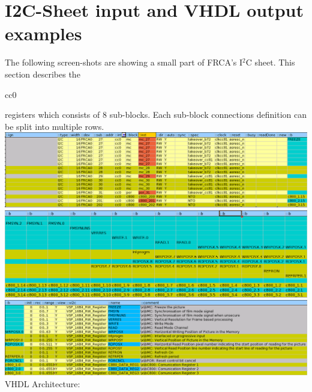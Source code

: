 \documentclass[a4paper,12pt]{report}
\begin{document}
\section{I2C-Sheet input and VHDL output examples}
The following screen-shots are showing a small part of  FRCA's I$^2$C sheet. This section describes the \begin{tt}cc0\end{tt} registers which consists of 8 sub-blocks. Each sub-block connections definition can be split into multiple rows.\newline
\newline
\includegraphics[scale=0.43]{images/FRCA_iic_part0.png}\newline
\newline
\includegraphics[scale=0.45]{images/FRCA_iic_part1.png}\newline
\newline
\includegraphics[scale=0.43]{images/FRCA_iic_part2.png}\newline
\newline
VHDL Architecture:\newline
\end{document}
